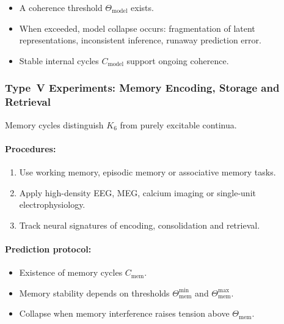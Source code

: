 \begin{itemize}
    \item A coherence threshold $\Theta_{\mathrm{model}}$ exists.
    \item When exceeded, model collapse occurs:
          fragmentation of latent representations,
          inconsistent inference,
          runaway prediction error.
    \item Stable internal cycles $C_{\mathrm{model}}$ support
          ongoing coherence.
\end{itemize}



\subsubsection{Type~V Experiments: Memory Encoding, Storage and Retrieval}

Memory cycles distinguish $K_6$ from purely excitable continua.

\paragraph{Procedures:}

\begin{enumerate}
    \item Use working memory, episodic memory or associative memory tasks.
    \item Apply high-density EEG, MEG, calcium imaging or single-unit
          electrophysiology.
    \item Track neural signatures of encoding, consolidation and retrieval.
\end{enumerate}

\paragraph{Prediction protocol:}

\begin{itemize}
    \item Existence of memory cycles $C_{\mathrm{mem}}$.
    \item Memory stability depends on thresholds 
          $\Theta_{\mathrm{mem}}^{\min}$ and
          $\Theta_{\mathrm{mem}}^{\max}$.
    \item Collapse when memory interference raises tension
          above $\Theta_{\mathrm{mem}}$.
\end{itemize}



